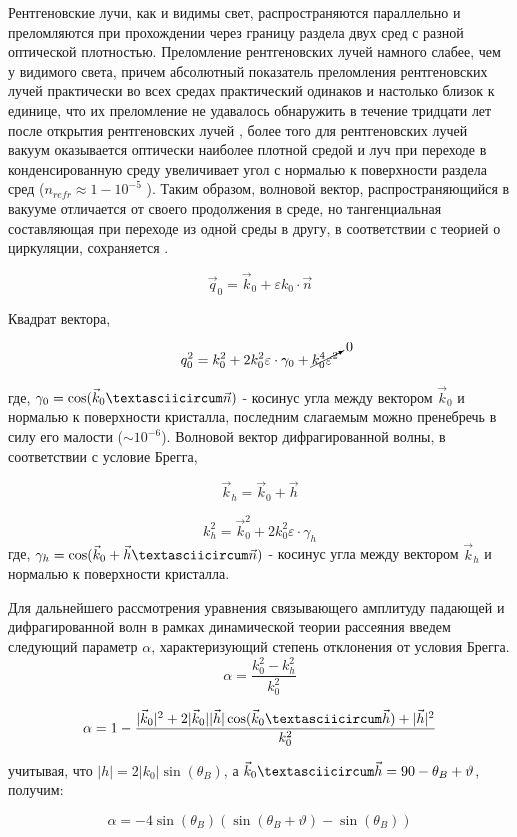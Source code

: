 Рентгеновские лучи, как и видимы свет, распространяются параллельно и преломляются при
прохождении через границу раздела двух сред с разной оптической плотностью.
 Преломление рентгеновских лучей намного слабее, чем у видимого света, причем
 абсолютный показатель преломления рентгеновских лучей практически во всех средах
 практический одинаков и настолько близок к единице, что их преломление не удавалось обнаружить
 в течение тридцати лет после открытия рентгеновских лучей \cite{fetisov2007}, более того
 для рентгеновских лучей вакуум оказывается оптически наиболее плотной средой и луч
 при переходе в конденсированную среду увеличивает угол с нормалью к поверхности раздела сред ($n_{refr} \approx 1-10^{-5}$ ).
 Таким образом, волновой вектор, распространяющийся в вакууме отличается от своего продолжения в
 среде, но тангенциальная составляющая при переходе из одной среды в другу, в соответствии с теорией о циркуляции, сохраняется \cite{landau_8_1992}.

 \begin{equation}
   \vec{q}_0 = \vec{k}_0 + \varepsilon k_0 \cdot \vec{n}
  \end{equation}

Квадрат вектора,

\begin{equation}
   q_0^2 = k_0^2 + 2k_0^2 \varepsilon \cdot \gamma_0 + \cancelto{0}{k_0^4  \varepsilon^2}
 \end{equation}

  где, $\gamma_0 = \cos(\vec{k}_0 \textasciicircum \vec{n})$ - косинус угла между вектором $\vec{k}_0$ и нормалью к поверхности кристалла,
  последним слагаемым можно пренебречь в силу его малости ($\sim 10^{-6}$).
  Волновой вектор дифрагированной волны, в соответствии с условие Брегга,

  $$\vec{k}_h = \vec{k}_0+\vec{h}$$

  \begin{equation}
     k_h^2 = \vec{k}_0^2+2k_0^2 \varepsilon \cdot \gamma_h
   \end{equation}
   где, $\gamma_h = \cos(\vec{k}_0+ \vec{h} \textasciicircum \vec{n})$ - косинус угла между вектором $\vec{k}_h$ и нормалью к поверхности кристалла.

Для дальнейшего рассмотрения уравнения связывающего амплитуду падающей и дифрагированной волн в рамках
динамической теории рассеяния введем следующий параметр $\alpha$, характеризующий степень отклонения от условия Брегга.
\begin{equation}
   \alpha = \frac{k_0^2-k_h^2}{k_0^2}
\end{equation}


$$  \alpha = 1 - \frac{|\vec{k}_0|^2+2|\vec{k}_0||\vec{h}|\cos(\vec{k}_0 \textasciicircum \vec{h})+|\vec{h}|^2}{k_0^2}$$

учитывая, что $ |h| = 2|k_0| \sin(\theta_B) $, а $\vec{k}_0 \textasciicircum \vec{h} = 90-\theta_B+\vartheta$, получим:

\begin{equation}
   \alpha = -4\sin(\theta_B)(\sin(\theta_B+\vartheta)-\sin(\theta_B))
\end{equation}
